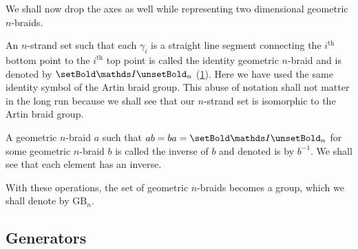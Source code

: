 \documentclass[oneside]{book}
\renewcommand{\symbb}[1]{\setBold \mathds #1 \unsetBold}
\newcommand{\I}{\symbb{I}}
\newcommand{\GB}{\text{GB}}
\newcommand{\In}{\symbb{I}_n}
\theoremstyle{definition}
\begin{document}
	We shall now drop the axes as well while representing two dimensional geometric \(n\)-braids.

	An \(n\)-strand set such that each \(\gamma_i\) is a straight line segment connecting the \(i^\text{th}\) bottom point to the \(i^\text{th}\) top point is called the identity geometric \(n\)-braid and is denoted by \(\In\) (\cref{fig:braididentity}). Here we have used the same identity symbol of the Artin braid group. This abuse of notation shall not matter in the long run because we shall see that our \(n\)-strand set is isomorphic to the Artin braid group.

	\begin{figure}[H]\centering
		\captionof{figure}{The identity \(\I_3\)}
		\label{fig:braididentity}
	\end{figure}

	A geometric \(n\)-braid \(a\) such that \(ab = ba = \In\) for some geometric \(n\)-braid \(b\) is called the inverse of \(b\) and denoted is by \(b^{-1}\). We shall see that each element has an inverse.

	With these operations, the set of geometric \(n\)-braids becomes a group, which we shall denote by \(\GB_n\).

	\subsection{Generators}
\end{document}
